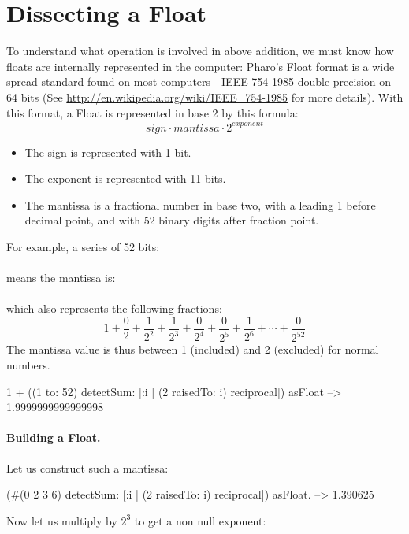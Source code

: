 \documentclass[a4paper,10pt,twoside]{book}
\begin{document}
\section{Dissecting a Float}
To understand what operation is involved in above addition, we must know how floats are internally represented in the computer: Pharo's Float format is a wide spread standard found on most computers - IEEE 754-1985 double precision on 64 bits
(See \url{http://en.wikipedia.org/wiki/IEEE_754-1985} for more details).
With this format, a Float is represented in base 2 by this formula: \[ sign \cdot mantissa \cdot 2^{exponent} \]
\begin{itemize}
\item The sign is represented with 1 bit.
\item The exponent is represented with 11 bits.
\item The mantissa is a fractional number in base two, with a leading 1 before decimal point, and with 52 binary digits after fraction point.
\end{itemize}

For example, a series of 52 bits:\\
\\
 means the mantissa is:\\
 \\
 which also represents the following fractions:  \[ 1 + \frac{0}{2} +  \frac{1}{2^2} +  \frac{1}{2^3} +  \frac{0}{2^4} +  \frac{0}{2^5} +  \frac{1}{2^6} + \cdots  +  \frac{0}{2^{52}} \]
The mantissa value is thus between 1 (included) and 2 (excluded) for normal numbers.

\begin{code}{}
1 + ((1 to: 52) detectSum: [:i | (2 raisedTo: i) reciprocal]) asFloat 
	--> 1.9999999999999998
\end{code}




\paragraph{Building a Float.}
Let us construct such a mantissa:
\begin{code}{}
(#(0 2 3 6) detectSum: [:i | (2 raisedTo: i) reciprocal]) asFloat.
	--> 1.390625
\end{code}

Now let us multiply by $2^3$ to get a non null exponent:
\end{document}
